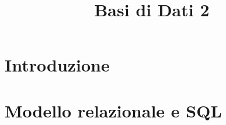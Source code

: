 




\title{Basi di Dati 2}

\maketitle

\newpage

\tableofcontents
\newpage

\chapter{Introduzione}



\clearpage

\chapter{Modello relazionale e SQL}



\clearpage

